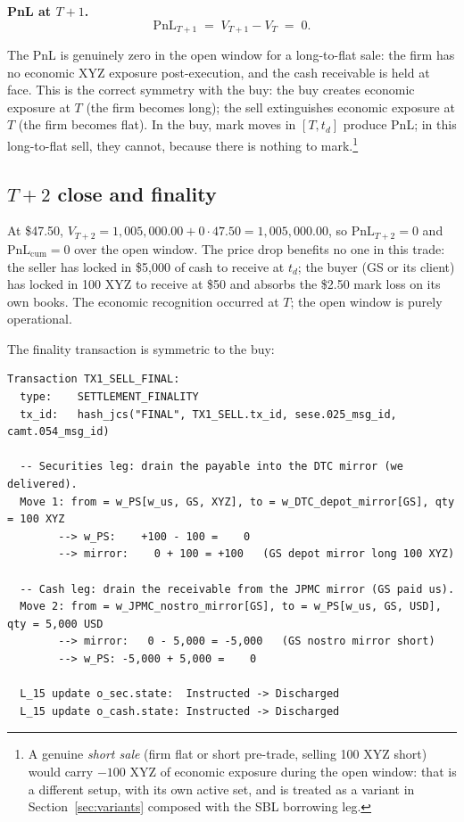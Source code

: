 \documentclass[11pt,a4paper]{article}
\begin{document}
\textbf{PnL at $T+1$.}
\[
\mathrm{PnL}_{T+1} \;=\; V_{T+1} - V_T \;=\; 0.
\]

The PnL is genuinely zero in the open window for a long-to-flat sale: the firm has no economic XYZ exposure post-execution, and the cash receivable is held at face. This is the correct symmetry with the buy: the buy creates economic exposure at $T$ (the firm becomes long); the sell extinguishes economic exposure at $T$ (the firm becomes flat). In the buy, mark moves in $[T, t_d]$ produce PnL; in this long-to-flat sell, they cannot, because there is nothing to mark.\footnote{A genuine \emph{short sale} (firm flat or short pre-trade, selling 100 XYZ short) would carry $-100$ XYZ of economic exposure during the open window: that is a different setup, with its own active set, and is treated as a variant in Section~\ref{sec:variants} composed with the SBL borrowing leg.}

\subsection{$T+2$ close and finality}

At \$47.50, $V_{T+2} = 1{,}005{,}000.00 + 0 \cdot 47.50 = 1{,}005{,}000.00$, so $\mathrm{PnL}_{T+2} = 0$ and $\mathrm{PnL}_{\mathrm{cum}} = 0$ over the open window. The price drop benefits no one in this trade: the seller has locked in \$5{,}000 of cash to receive at $t_d$; the buyer (GS or its client) has locked in 100 XYZ to receive at \$50 and absorbs the \$2.50 mark loss on its own books. The economic recognition occurred at $T$; the open window is purely operational.

The finality transaction is symmetric to the buy:

\begin{lstlisting}
Transaction TX1_SELL_FINAL:
  type:    SETTLEMENT_FINALITY
  tx_id:   hash_jcs("FINAL", TX1_SELL.tx_id, sese.025_msg_id, camt.054_msg_id)

  -- Securities leg: drain the payable into the DTC mirror (we delivered).
  Move 1: from = w_PS[w_us, GS, XYZ], to = w_DTC_depot_mirror[GS], qty = 100 XYZ
        --> w_PS:    +100 - 100 =    0
        --> mirror:    0 + 100 = +100   (GS depot mirror long 100 XYZ)

  -- Cash leg: drain the receivable from the JPMC mirror (GS paid us).
  Move 2: from = w_JPMC_nostro_mirror[GS], to = w_PS[w_us, GS, USD], qty = 5,000 USD
        --> mirror:   0 - 5,000 = -5,000   (GS nostro mirror short)
        --> w_PS: -5,000 + 5,000 =    0

  L_15 update o_sec.state:  Instructed -> Discharged
  L_15 update o_cash.state: Instructed -> Discharged
\end{lstlisting}
\end{document}
